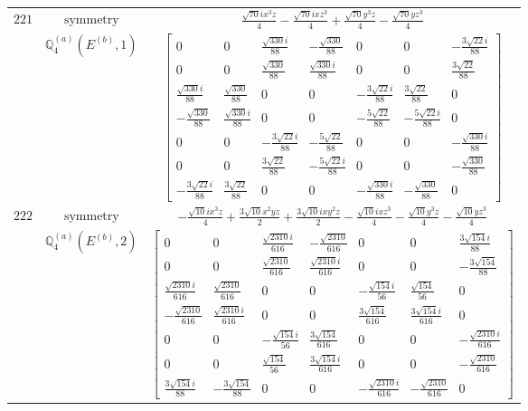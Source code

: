 \documentclass[fleqn,8pt,landscape]{jsarticle}
\begin{document}
\begin{longtable}{ccc}
$ 221 $ & $ \text{symmetry} $ & $ \frac{\sqrt{70} i x^{3} z}{4} - \frac{\sqrt{70} i x z^{3}}{4} + \frac{\sqrt{70} y^{3} z}{4} - \frac{\sqrt{70} y z^{3}}{4} $ \\
$  $ & $ \mathbb{Q}_{4}^{(a)}(E^{(b)},1) $ & $ \begin{bmatrix} 0 & 0 & \frac{\sqrt{330} i}{88} & - \frac{\sqrt{330}}{88} & 0 & 0 & - \frac{3 \sqrt{22} i}{88} \\ 0 & 0 & \frac{\sqrt{330}}{88} & \frac{\sqrt{330} i}{88} & 0 & 0 & \frac{3 \sqrt{22}}{88} \\ \frac{\sqrt{330} i}{88} & \frac{\sqrt{330}}{88} & 0 & 0 & - \frac{3 \sqrt{22} i}{88} & \frac{3 \sqrt{22}}{88} & 0 \\ - \frac{\sqrt{330}}{88} & \frac{\sqrt{330} i}{88} & 0 & 0 & - \frac{5 \sqrt{22}}{88} & - \frac{5 \sqrt{22} i}{88} & 0 \\ 0 & 0 & - \frac{3 \sqrt{22} i}{88} & - \frac{5 \sqrt{22}}{88} & 0 & 0 & - \frac{\sqrt{330} i}{88} \\ 0 & 0 & \frac{3 \sqrt{22}}{88} & - \frac{5 \sqrt{22} i}{88} & 0 & 0 & - \frac{\sqrt{330}}{88} \\ - \frac{3 \sqrt{22} i}{88} & \frac{3 \sqrt{22}}{88} & 0 & 0 & - \frac{\sqrt{330} i}{88} & - \frac{\sqrt{330}}{88} & 0 \end{bmatrix} $ \\ \hline
$ 222 $ & $ \text{symmetry} $ & $ - \frac{\sqrt{10} i x^{3} z}{4} + \frac{3 \sqrt{10} x^{2} y z}{2} + \frac{3 \sqrt{10} i x y^{2} z}{2} - \frac{\sqrt{10} i x z^{3}}{4} - \frac{\sqrt{10} y^{3} z}{4} - \frac{\sqrt{10} y z^{3}}{4} $ \\
$  $ & $ \mathbb{Q}_{4}^{(a)}(E^{(b)},2) $ & $ \begin{bmatrix} 0 & 0 & \frac{\sqrt{2310} i}{616} & - \frac{\sqrt{2310}}{616} & 0 & 0 & \frac{3 \sqrt{154} i}{88} \\ 0 & 0 & \frac{\sqrt{2310}}{616} & \frac{\sqrt{2310} i}{616} & 0 & 0 & - \frac{3 \sqrt{154}}{88} \\ \frac{\sqrt{2310} i}{616} & \frac{\sqrt{2310}}{616} & 0 & 0 & - \frac{\sqrt{154} i}{56} & \frac{\sqrt{154}}{56} & 0 \\ - \frac{\sqrt{2310}}{616} & \frac{\sqrt{2310} i}{616} & 0 & 0 & \frac{3 \sqrt{154}}{616} & \frac{3 \sqrt{154} i}{616} & 0 \\ 0 & 0 & - \frac{\sqrt{154} i}{56} & \frac{3 \sqrt{154}}{616} & 0 & 0 & - \frac{\sqrt{2310} i}{616} \\ 0 & 0 & \frac{\sqrt{154}}{56} & \frac{3 \sqrt{154} i}{616} & 0 & 0 & - \frac{\sqrt{2310}}{616} \\ \frac{3 \sqrt{154} i}{88} & - \frac{3 \sqrt{154}}{88} & 0 & 0 & - \frac{\sqrt{2310} i}{616} & - \frac{\sqrt{2310}}{616} & 0 \end{bmatrix} $ \\ \hline

\end{longtable}
\end{document}
